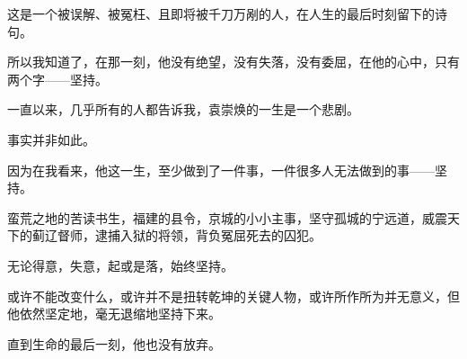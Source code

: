 \begin{multicols}{\theparacolNo}
		这是一个被误解、被冤枉、且即将被千刀万剐的人，在人生的最后时刻留下的诗句。

		所以我知道了，在那一刻，他没有绝望，没有失落，没有委屈，在他的心中，只有两个字——坚持。

		一直以来，几乎所有的人都告诉我，袁崇焕的一生是一个悲剧。

		事实并非如此。

		因为在我看来，他这一生，至少做到了一件事，一件很多人无法做到的事——坚持。

		蛮荒之地的苦读书生，福建的县令，京城的小小主事，坚守孤城的宁远道，威震天下的蓟辽督师，逮捕入狱的将领，背负冤屈死去的囚犯。

		无论得意，失意，起或是落，始终坚持。

		或许不能改变什么，或许并不是扭转乾坤的关键人物，或许所作所为并无意义，但他依然坚定地，毫无退缩地坚持下来。

		直到生命的最后一刻，他也没有放弃。
		\ifnum{}
	\end{multicols}
\fi
\newpage
